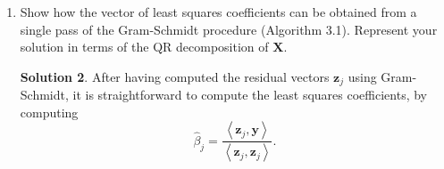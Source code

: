 \documentclass[]{book}
\theoremstyle{definition}
\newtheorem*{soln}{Solution}
\newcommand{\ip}[2]{\left\langle{#1},{#2}\right\rangle}
\newcommand{\XX}{\mathbf{X}} \newcommand{\YY}{\mathbf{Y}}
\newcommand{\DD}{\mathbf{D}}
\newcommand{\yy}{\mathbf{y}}
\newcommand{\cc}{\mathbf{c}}
\newcommand{\zz}{\mathbf{z}}
\begin{document}
\begin{enumerate}
\begin{soln}
\begin{enumerate}
			We now compute the variance of $\tilde\theta$:
			\begin{equation}
				\begin{split}
					\Var[\tilde\theta] &= \Var[\cc^T\yy] \\
					&= \cc^T\Var[\yy]\cc \\
					&= \sigma^2\cc^T\cc \\
					&= \sigma^2(\cc_0^T+d^T)(\cc_0+d) \\
					&= \sigma^2(a^T(\XX^T\XX)^{-1}\XX^T+d^T)(\XX(\XX^T\XX)^{-1}a+d) \\
					&= \sigma^2a^T(\XX^T\XX)^{-1} a + \sigma^2d^Td \\
					&= a^T\sigma^2(\XX^T\XX)^{-1}a + \sigma^2d^Td \\
					&= a^T\Var[\hat\beta]a + \sigma^2d^Td \\
					&= \Var[\hat\theta] + \sigma^2\|d\|^2 \\
					&\ge \Var[\hat\theta].
				\end{split}
			\end{equation}

			\item We can show that this extends to the whole variance-covariance matrix.
			Letting the above $a=I$ the identity matrix and $d=\DD$ any $(p+1)\times(p+1)$
			matrix, we get that 
			\begin{equation}
				\begin{split}
					\Var[\tilde\beta] &= \Var[\hat\beta] + \sigma^2\DD^T\DD
				\end{split}
			\end{equation}
			Therefore, $\Var[\hat\beta]-\Var[\tilde\beta] = \sigma^2\DD^T\DD$ is 
			a Gram matrix and therefore positive-semidefinite.
		\end{enumerate}

		\paragraph{Note.} Another way of stating the Gauss-Markov theorem is that 
		the least squares estimator $\hat\beta$ is \emph{BLUE}: best linear
		unbiased estimator.
	\end{soln}

	\item\label{ex:3.4} Show how the vector of least squares coefficients can 
	be obtained from a single pass of the Gram-Schmidt procedure (Algorithm 3.1).
	Represent your solution in terms of the QR decomposition of $\XX$.

	\begin{soln}
		After having computed the residual vectors $\zz_j$ using Gram-Schmidt, it is straightforward
		to compute the least squares coefficients, by computing
		\[\hat\beta_j=\frac{\ip{\zz_j}{\yy}}{\ip{\zz_j}{\zz_j}}.\]


\end{soln}
\end{enumerate}
\end{document}
